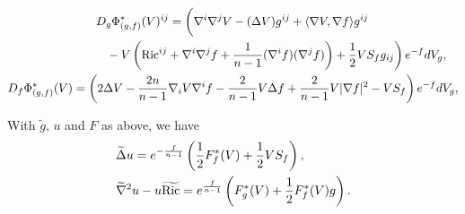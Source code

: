 \documentclass[10pt,a4paper]{amsart}
\begin{document}
\begin{gather}
		D_g\Phi_{(g,f)}^*(V)^{ij}
		  = \left(
		\nabla^i\nabla^j V-(\Delta V) g^{ij}
		+\langle\nabla V,\nabla f\rangle g^{ij}\vphantom{\frac{1}{n-1}}\right. \nonumber\\
\left. \hphantom{D_g\Phi_{(g,f)}^*(V)^{ij}=}{}
		- V\left(\mathrm{Ric}^{ij}+\nabla^i\nabla^j f+\frac{1}{n-1} (\nabla^i f)(\nabla^j f)\right)
 +\frac12 V S_f g_{ij}
		\right) {\rm e}^{-f}{\rm d}V_g,\label{eq-adjoint}\\
		D_f\Phi_{(g,f)}^*(V)
		  = \left(
		2\Delta V
		-\frac{2n}{n-1} \nabla_i V \nabla^i f
		-\frac{2}{n-1} V \Delta f
		 +\frac{2}{n-1} V |\nabla f|^2
		- V S_f
		\right) {\rm e}^{-f}{\rm d}V_g,\nonumber
\end{gather}

\begin{Lemma}\label{lem-fstatic-conf-identities}
	With $\widetilde g$, $u$ and $F$ as above, we have
	\begin{align}
		\label{eq-conf-lap}
&		\widetilde\Delta u
={\rm e}^{-\frac{f}{n-1}}\left(\frac12 F_f^*(V)+\frac12 V S_f\right),\\
		\label{eq-conf-hessric}
&		\widetilde\nabla^2 u-u \widetilde{\mathrm{Ric}}
={\rm e}^{\frac{f}{n-1}}\left(F_g^*(V)+\frac12 F_f^*(V) g\right).
	\end{align}
\end{Lemma}
\end{document}
